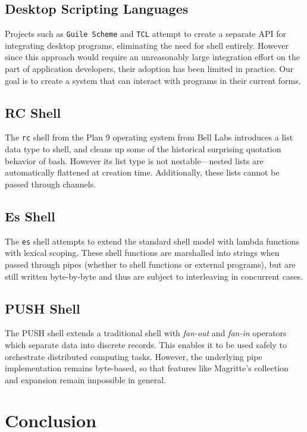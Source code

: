 \documentclass[english,PRO]{ipsj}
\begin{document}
\subsection{Desktop Scripting Languages}\noindent
Projects such as \verb/Guile Scheme/\cite{guile} and \verb/TCL/\cite{tcl} attempt to create a separate API for integrating desktop programs, eliminating the need for shell entirely. However since this approach would require an unreasonably large integration effort on the part of application developers, their adoption has been limited in practice. Our goal is to create a system that can interact with programs in their current forms.

\subsection{RC Shell}\noindent
The \verb/rc/ shell \cite{duff} from the Plan 9 operating system from Bell Labs introduces a list data type to shell, and cleans up some of the historical surprising quotation behavior of bash. However its list type is not nestable---nested lists are automatically flattened at creation time. Additionally, these lists cannot be passed through channels.

\subsection{Es Shell}
\noindent
The \verb/es/ shell \cite{haahr} attempts to extend the standard shell model with lambda functions with lexical scoping. These shell functions are marshalled into strings when passed through pipes (whether to shell functions or external programs), but are still written byte-by-byte and thus are subject to interleaving in concurrent cases.

\subsection{PUSH Shell}\noindent
The PUSH shell\cite{push} extends a traditional shell with \emph{fan-out} and \emph{fan-in} operators which separate data into discrete records. This enables it to be used safely to orchestrate distributed computing tasks. However, the underlying pipe implementation remains byte-based, so that features like Magritte's collection and expansion remain impossible in general.

\section{Conclusion}\label{conclusion}
\end{document}
